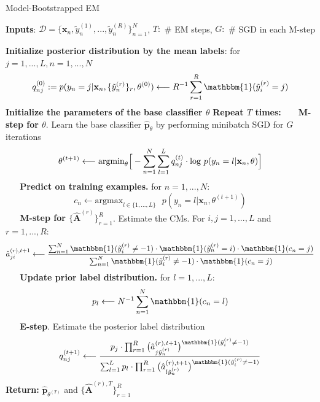 \begin{algorithm}
	\caption{Model-Bootstrapped EM \cite{khetan2017learning}}
	\label{alg:generalised_em}
	\footnotesize
	\begin{algorithmic}
		\State \textbf{Inputs}: $\mathcal{D} = \{\textbf{x}_n, \tilde{y}^{(1)}_{n},...,\tilde{y}^{(R)}_{n}\}_{n=1}^{N}$,
		$T:$ \# EM steps, $G:$ \# SGD in each M-step
		
		\State \textbf{Initialize posterior distribution by the mean labels}: for $j=1,..., L, n=1,...,N$
		\vspace{-2mm}
		$$q_{nj} ^{(0)}: = p(y_{n}=j|\textbf{x}_{n}, \{\tilde{y}^{(r)}_{n}\}_r, \theta^{(0)}) \longleftarrow R^{-1}\sum_{r=1}^R \mathbbm{1}(\tilde{y}_{i}^{(r)}=j) $$
		\vspace{-3mm}
		\State \textbf{Initialize the parameters of the base classifier $\theta$}
		\State \textbf{Repeat $T$ times:}
		\State $\,\,\,\,\,\,\,\,$ \textbf{M-step for $\theta$}. Learn the base classifier  $\hat{\mathbf{p}}_{\theta}$ by performing minibatch SGD for $G$ iterations 
		\vspace{-2mm}
		$$\theta^{(t+1)} \longleftarrow \text{argmin}_{\theta}\Big{[}-\sum_{n=1}^{N}\sum_{l=1}^{L}q_{nj} ^{(t)}\cdot \text{log } p(y_{n}=l|\mathbf{x}_{n}, \theta)\Big{]}$$ 
		\vspace{-3mm}
		\State $\,\,\,\,\,\,\,\,$ \textbf{Predict on training examples.} for $n=1,...,N$:
		\vspace{-2mm}
		$$c_{n} \longleftarrow \text{argmax}_{l\in\{1,...,L\}}\text{ }p(y_{n}=l|\mathbf{x}_{n}, \theta^{(t+1)}) $$
		\vspace{-3mm}
		\State $\,\,\,\,\,\,\,\,$ \textbf{M-step for $\{\hat{\mathbf{A}}^{(r)}\}_{r=1}^{R}$}. Estimate the CMs. For $i,j=1,...,L$ and $r=1,...,R$:
		\vspace{-2mm}
		$$\hat{a}_{ji}^{(r),t+1} \longleftarrow \frac{\sum_{n=1}^{N}\mathbbm{1}(\tilde{y}_{i}^{(r)} \neq -1)\cdot \mathbbm{1}(\tilde{y}^{(r)}_{n}=i)\cdot \mathbbm{1}(c_{n}=j)}{\sum_{n=1}^{N} \mathbbm{1}(\tilde{y}_{i}^{(r)} \neq -1)\cdot \mathbbm{1}(c_{n}=j)}$$ 
		\vspace{-3mm}
		\State $\,\,\,\,\,\,\,\,$ \textbf{Update prior label distribution.} for $l=1,...,L$:
		\vspace{-3mm}
		$$p_{l} \longleftarrow N^{-1}\sum_{n=1}^N \mathbbm{1}(c_{n}=l) $$
		\vspace{-3mm}
		\State $\,\,\,\,\,\,\,\,$  \textbf{E-step}. Estimate the posterior label distribution
		\vspace{-2mm}
		$$q_{nj} ^{(t+1)} \longleftarrow \frac{p_{j}\cdot\prod_{r=1}^{R}\big{(}\hat{a}^{(r),t+1}_{j\tilde{y}^{(r)}_{n}}\big{)}^{\mathbbm{1}(\tilde{y}_{i}^{(r)} \neq -1)}}{\sum_{l=1}^L p_{l}\cdot\prod_{r=1}^{R}\big{(}\hat{a}^{(r),t+1}_{l\tilde{y}^{(r)}_{n}}\big{)}^{\mathbbm{1}(\tilde{y}_{i}^{(r)} \neq -1)}}$$
		\vspace{-3mm}
		\State \textbf{Return:   } $\hat{\mathbf{p}}_{\theta^{(T)}}$ and $\{\hat{\mathbf{A}}^{(r),T}\}_{r=1}^R$
	\end{algorithmic}
\end{algorithm}




